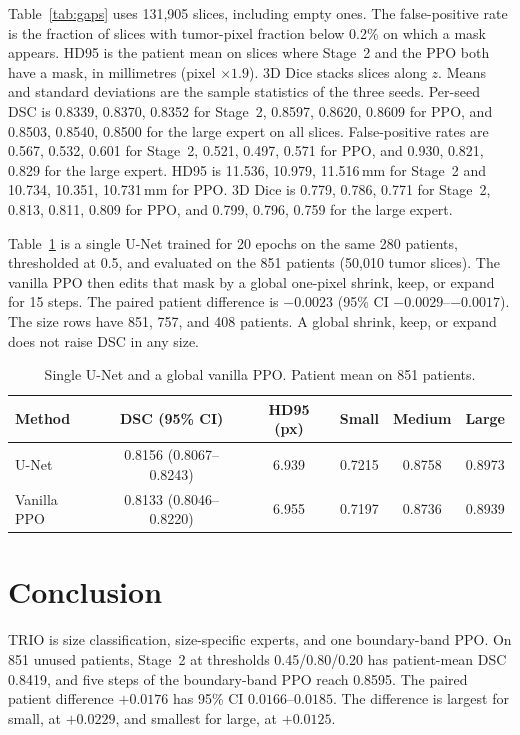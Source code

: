 \documentclass[runningheads]{llncs}
\begin{document}
Table~\ref{tab:gaps} uses 131{,}905 slices, including empty ones. The false-positive rate is the fraction of slices with tumor-pixel fraction below 0.2\% on which a mask appears. HD95 is the patient mean on slices where Stage~2 and the PPO both have a mask, in millimetres (pixel $\times 1.9$). 3D Dice stacks slices along $z$. Means and standard deviations are the sample statistics of the three seeds. Per-seed DSC is 0.8339, 0.8370, 0.8352 for Stage~2, 0.8597, 0.8620, 0.8609 for PPO, and 0.8503, 0.8540, 0.8500 for the large expert on all slices. False-positive rates are 0.567, 0.532, 0.601 for Stage~2, 0.521, 0.497, 0.571 for PPO, and 0.930, 0.821, 0.829 for the large expert. HD95 is 11.536, 10.979, 11.516\,mm for Stage~2 and 10.734, 10.351, 10.731\,mm for PPO. 3D Dice is 0.779, 0.786, 0.771 for Stage~2, 0.813, 0.811, 0.809 for PPO, and 0.799, 0.796, 0.759 for the large expert.

Table~\ref{tab:unet} is a single U-Net trained for 20 epochs on the same 280 patients, thresholded at 0.5, and evaluated on the 851 patients (50{,}010 tumor slices). The vanilla PPO then edits that mask by a global one-pixel shrink, keep, or expand for 15 steps. The paired patient difference is $-0.0023$ (95\% CI $-0.0029$--$-0.0017$). The size rows have 851, 757, and 408 patients. A global shrink, keep, or expand does not raise DSC in any size.

\begin{table}[!ht]
\caption{Single U-Net and a global vanilla PPO. Patient mean on 851 patients.}
\label{tab:unet}
\centering
\small
\setlength{\tabcolsep}{4pt}
\begin{tabular}{|l|c|c|c|c|c|}
\hline
Method & DSC (95\% CI) & HD95 (px) & Small & Medium & Large \\
\hline
U-Net & 0.8156 (0.8067--0.8243) & 6.939 & 0.7215 & 0.8758 & 0.8973 \\
\hline
Vanilla PPO & 0.8133 (0.8046--0.8220) & 6.955 & 0.7197 & 0.8736 & 0.8939 \\
\hline
\end{tabular}
\end{table}

\section{Conclusion}

TRIO is size classification, size-specific experts, and one boundary-band PPO. On 851 unused patients, Stage~2 at thresholds 0.45/0.80/0.20 has patient-mean DSC 0.8419, and five steps of the boundary-band PPO reach 0.8595. The paired patient difference $+0.0176$ has 95\% CI $0.0166$--$0.0185$. The difference is largest for small, at $+0.0229$, and smallest for large, at $+0.0125$.
\end{document}
